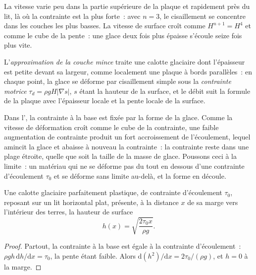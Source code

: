 La vitesse varie peu dans la partie supérieure de la plaque et rapidement près du
lit, là où la contrainte est la plus forte~: avec $n = 3$, le cisaillement se concentre dans
les couches les plus basses. La vitesse de surface croît comme $H^{n+1} = H^4$ et comme le
cube de la pente~: une glace deux fois plus épaisse s'écoule seize fois plus vite.

\begin{definition}\label{def:b3:glaciology:sia}
L'\emph{approximation de la couche mince} traite
une calotte glaciaire dont l'épaisseur est petite devant sa largeur, comme localement une
plaque à bords parallèles~: en chaque point, la glace se déforme par cisaillement simple
sous la \emph{contrainte motrice} $\tau_d = \rho gH|\nabla s|$, $s$ étant la hauteur de la
surface, et le débit suit la formule de la plaque avec l'épaisseur locale et la
pente locale de la surface.
\end{definition}

Dans l', la contrainte à la base est fixée par la forme de la
glace. Comme la vitesse de déformation croît comme le cube de la contrainte, une faible
augmentation de contrainte produit un fort accroissement de l'écoulement, lequel amincit la glace
et abaisse à nouveau la contrainte~: la contrainte reste dans une plage étroite, quelle que soit
la taille de la masse de glace. Poussons ceci à la limite~: un matériau qui ne se déforme pas du
tout en dessous d'une contrainte d'écoulement $\tau_0$ et se déforme sans limite au-delà,
et la forme en découle.

\begin{proposition}\label{prop:b3:glaciology:nye}
Une calotte glaciaire parfaitement plastique, de contrainte d'écoulement $\tau_0$, reposant
sur un lit horizontal plat, présente, à la distance $x$ de sa marge vers l'intérieur des terres, la hauteur de surface
\[
h(x) = \sqrt{\frac{2\tau_0x}{\rho g}} .
\]
\end{proposition}

\begin{proof}
Partout, la contrainte à la base est égale à la contrainte d'écoulement~: $\rho gh\,\mathrm
dh/\mathrm dx = \tau_0$, la pente étant faible. Alors $\mathrm d(h^2)/\mathrm
dx = 2\tau_0/(\rho g)$, et $h = 0$ à la marge.
\end{proof}

